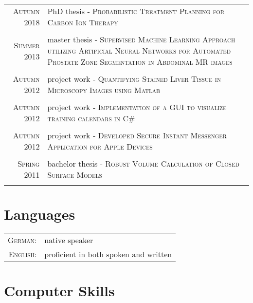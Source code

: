 \documentclass[a4paper,10pt]{article}
\begin{document}
\begin{longtable}{r|p{11cm}}
\textsc{Autumn 2018} & PhD thesis - \textsc{Probabilistic Treatment Planning for Carbon Ion Therapy} \\
\multicolumn{2}{c}{} \\

\textsc{Summer 2013} & master thesis - \textsc{Supervised Machine Learning Approach utilizing Artificial Neural Networks for Automated Prostate Zone Segmentation in Abdominal MR images} \\
\multicolumn{2}{c}{} \\

\textsc{Autumn 2012} & project work - \textsc{Quantifying Stained Liver Tissue in Microscopy Images using Matlab } \\
\multicolumn{2}{c}{} \\

\textsc{Autumn 2012} & project work - \textsc{Implementation of a GUI to visualize training calendars in C\#} \\
\multicolumn{2}{c}{} \\

\textsc{Autumn 2012} & project work - \textsc{Developed Secure Instant Messenger Application for Apple Devices} \\
\multicolumn{2}{c}{} \\

\textsc{Spring 2011} & bachelor thesis - \textsc{Robust Volume Calculation of Closed Surface Models} \\
\multicolumn{2}{c}{} \\

\end{longtable}


\section{Languages}

\begin{tabular}{rl}
\textsc{German:} & native speaker\\

\textsc{English:} & proficient in both spoken and written \\
\end{tabular}


\vspace{0.5cm}

\section{Computer Skills}
\end{document}
